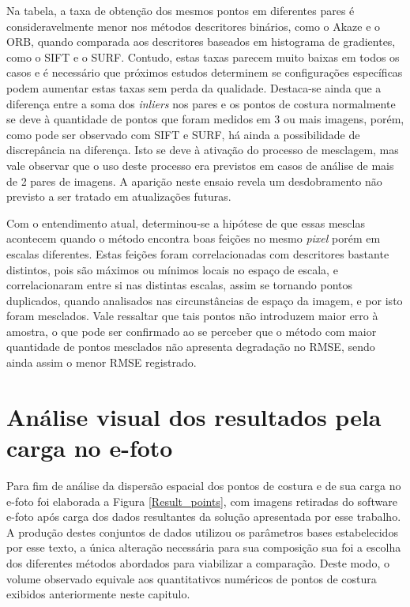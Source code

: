 Na tabela, a taxa de obtenção dos mesmos pontos em diferentes pares é consideravelmente menor nos métodos descritores binários, como o Akaze e o ORB, quando comparada aos descritores baseados em histograma de gradientes, como o SIFT e o SURF. Contudo, estas taxas parecem muito baixas em todos os casos e é necessário que próximos estudos determinem se configurações específicas podem aumentar estas taxas sem perda da qualidade. Destaca-se ainda que a diferença entre a soma dos \textit{inliers} nos pares e os pontos de costura normalmente se deve à quantidade de pontos que foram medidos em 3 ou mais imagens, porém, como pode ser observado com SIFT e SURF, há ainda a possibilidade de discrepância na diferença. Isto se deve à ativação do processo de mesclagem, mas vale observar que o uso deste processo era previstos em casos de análise de mais de 2 pares de imagens. A aparição neste ensaio revela um desdobramento não previsto a ser tratado em atualizações futuras.

Com o entendimento atual, determinou-se a hipótese de que essas mesclas acontecem quando o método encontra boas feições no mesmo \textit{pixel} porém em escalas diferentes. Estas feições foram correlacionadas com descritores bastante distintos, pois são máximos ou mínimos locais no espaço de escala, e correlacionaram entre si nas distintas escalas, assim se tornando pontos duplicados, quando analisados nas circunstâncias de espaço da imagem, e por isto foram mesclados. Vale ressaltar que tais pontos não introduzem maior erro à amostra, o que pode ser confirmado ao se perceber que o método com maior quantidade de pontos mesclados não apresenta degradação no RMSE, sendo ainda assim o menor RMSE registrado.



\section{Análise visual dos resultados pela carga no e-foto}

Para fim de análise da dispersão espacial dos pontos de costura e de sua carga no e-foto foi elaborada a Figura \ref{Result_points}, com imagens retiradas do software e-foto após carga dos dados resultantes da solução apresentada por esse trabalho. A produção destes conjuntos de dados utilizou os parâmetros bases estabelecidos por esse texto, a única alteração necessária para sua composição sua foi a escolha dos diferentes métodos abordados para viabilizar a comparação. Deste modo, o volume observado equivale aos quantitativos numéricos de pontos de costura exibidos anteriormente neste capitulo.

